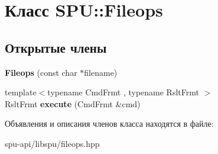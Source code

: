 \hypertarget{class_s_p_u_1_1_fileops}{}\section{Класс S\+PU\+:\+:Fileops}
\label{class_s_p_u_1_1_fileops}
\subsection*{Открытые члены}
\begin{DoxyCompactItemize}
\item 
\mbox{\label{class_s_p_u_1_1_fileops_a8db10c5df536ad53d91ce5bcfdaa706e}} 
{\bfseries Fileops} (const char $\ast$filename)
\item 
\mbox{\label{class_s_p_u_1_1_fileops_a01121dc906965cc5ce3feba8dfbdcbec}} 
{\footnotesize template$<$typename Cmd\+Frmt , typename Rslt\+Frmt $>$ }\\Rslt\+Frmt {\bfseries execute} (Cmd\+Frmt \&cmd)
\end{DoxyCompactItemize}


Объявления и описания членов класса находятся в файле\+:\begin{DoxyCompactItemize}
\item 
spu-\/api/libspu/fileops.\+hpp\end{DoxyCompactItemize}
